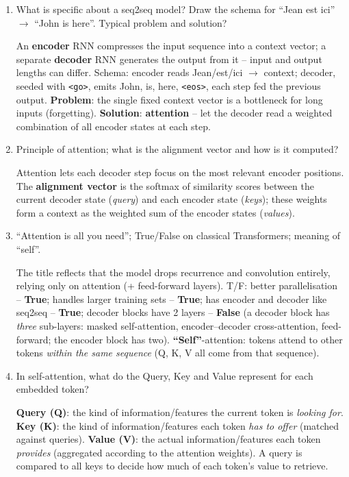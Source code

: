 \documentclass[10pt,a4paper]{article}
\newcommand{\q}[1]{\item #1}
\begin{document}
\begin{enumerate}[leftmargin=*,label=\textbf{Q\arabic*.}]

\q What is specific about a seq2seq model? Draw the schema for ``Jean est ici'' $\to$ ``John is here''. Typical problem and solution?
\begin{answerbox}
An \textbf{encoder} RNN compresses the input sequence into a context vector; a separate \textbf{decoder} RNN generates the output from it -- input and output lengths can differ. Schema: encoder reads Jean/est/ici $\to$ context; decoder, seeded with \texttt{<go>}, emits John, is, here, \texttt{<eos>}, each step fed the previous output. \textbf{Problem}: the single fixed context vector is a bottleneck for long inputs (forgetting). \textbf{Solution}: \textbf{attention} -- let the decoder read a weighted combination of all encoder states at each step.
\end{answerbox}

\q Principle of attention; what is the alignment vector and how is it computed?
\begin{answerbox}
Attention lets each decoder step focus on the most relevant encoder positions. The \textbf{alignment vector} is the softmax of similarity scores between the current decoder state (\emph{query}) and each encoder state (\emph{keys}); these weights form a context as the weighted sum of the encoder states (\emph{values}).
\end{answerbox}

\q ``Attention is all you need''; True/False on classical Transformers; meaning of ``self''.
\begin{answerbox}
The title reflects that the model drops recurrence and convolution entirely, relying only on attention (+ feed-forward layers). T/F: better parallelisation -- \textbf{True}; handles larger training sets -- \textbf{True}; has encoder and decoder like seq2seq -- \textbf{True}; decoder blocks have 2 layers -- \textbf{False} (a decoder block has \emph{three} sub-layers: masked self-attention, encoder--decoder cross-attention, feed-forward; the encoder block has two). \textbf{``Self''}-attention: tokens attend to other tokens \emph{within the same sequence} (Q, K, V all come from that sequence).
\end{answerbox}

\q In self-attention, what do the Query, Key and Value represent for each embedded token?
\begin{answerbox}
\textbf{Query (Q)}: the kind of information/features the current token is \emph{looking for}. \textbf{Key (K)}: the kind of information/features each token \emph{has to offer} (matched against queries). \textbf{Value (V)}: the actual information/features each token \emph{provides} (aggregated according to the attention weights). A query is compared to all keys to decide how much of each token's value to retrieve.
\end{answerbox}


\end{enumerate}
\end{document}
